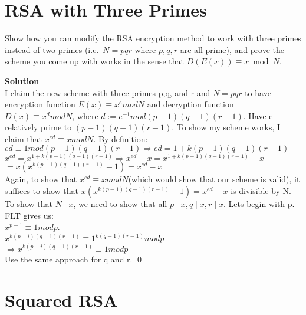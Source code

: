 \documentclass[11pt]{article}
\newcommand*{\Question}[1]{\section{#1}}
\begin{document}
\Question{RSA with Three Primes}
Show how you can modify the RSA encryption method to work with three primes instead of two primes (i.e.\ $N=pqr$ where $p, q, r$ are all prime), and prove the scheme you come up with works in the sense that $D(E(x)) \equiv x \bmod N$.
\begin{mdframed} \textbf{Solution} \\
I claim the new scheme with three primes p,q, and r and $N=pqr$ to have encryption function $E(x) \equiv x^emodN$ and decryption function $D(x) \equiv x^dmodN$, where $d:=e^{-1}mod(p-1)(q-1)(r-1)$. Have e relatively prime to $(p-1)(q-1)(r-1)$. To show my scheme works, I claim that $x^{ed}\equiv xmodN$. By definition: \\
$ed \equiv 1mod(p-1)(q-1)(r-1) \Rightarrow ed=1+k(p-1)(q-1)(r-1)$ \\
$x^{ed}=x^{1+k(p-1)(q-1)(r-1)} \Rightarrow x^{ed}-x=x^{1+k(p-1)(q-1)(r-1)}-x$ \\
$=x(x^{k(p-1)(q-1)(r-1)}-1)=x^{ed}-x$ \\ 
Again, to show that $x^{ed} \equiv xmodN$(which would show that our scheme is valid), it suffices to show that $x(x^{k(p-1)(q-1)(r-1)}-1)=x^{ed}-x$ is divisible by N. \\
To show that $N \mid x$, we need to show that all $p \mid x, q \mid x, r \mid x$. Lets begin with p. FLT gives us: \\
$x^{p-1} \equiv 1modp$. \\
$x^{k(p-i)(q-1)(r-1)} \equiv 1^{k(q-1)(r-1)}modp$ \\
$\Rightarrow x^{k(p-i)(q-1)(r-1)} \equiv 1modp$ \\
Use the same approach for q and r. \qed
\end{mdframed}


\Question{Squared RSA}
\end{document}
